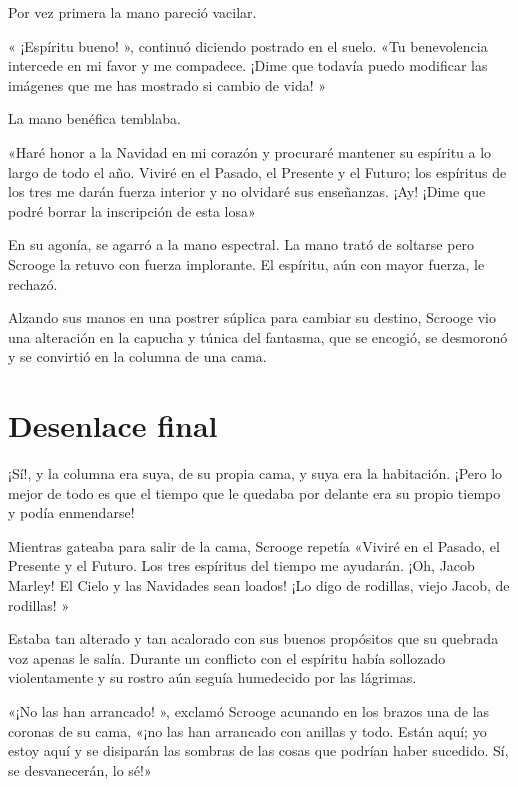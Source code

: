 \documentclass{novela}
\begin{document}
 Por vez primera la mano pareció vacilar.

 « ¡Espíritu bueno! », continuó diciendo postrado en el suelo. «Tu benevolencia intercede en mi favor y me compadece. ¡Dime que todavía puedo modificar las imágenes que me has mostrado si cambio de vida! »

 La mano benéfica temblaba.

 «Haré honor a la Navidad en mi corazón y procuraré mantener su espíritu a lo largo de todo el año. Viviré en el Pasado, el Presente y el Futuro; los espíritus de los tres me darán fuerza interior y no olvidaré sus enseñanzas. ¡Ay! ¡Dime que podré borrar la inscripción de esta losa»

 En su agonía, se agarró a la mano espectral. La mano trató de soltarse pero Scrooge la retuvo con fuerza implorante. El espíritu, aún con mayor fuerza, le rechazó.

 Alzando sus manos en una postrer súplica para cambiar su destino, Scrooge vio una alteración en la capucha y túnica del fantasma, que se encogió, se desmoronó y se convirtió en la columna de una cama.






 \chapter{Desenlace final}



 ¡Sí!, y la columna era suya, de su propia cama, y suya era la habitación. ¡Pero lo mejor de todo es que el tiempo que le quedaba por delante era su propio tiempo y podía enmendarse!

 Mientras gateaba para salir de la cama, Scrooge repetía «Viviré en el Pasado, el Presente y el Futuro. Los tres espíritus del tiempo me ayudarán. ¡Oh, Jacob Marley! El Cielo y las Navidades sean loados! ¡Lo digo de rodillas, viejo Jacob, de rodillas! »

 Estaba tan alterado y tan acalorado con sus buenos propósitos que su quebrada voz apenas le salía. Durante un conflicto con el espíritu había sollozado violentamente y su rostro aún seguía humedecido por las lágrimas.

 «¡No las han arrancado! », exclamó Scrooge acunando en los brazos una de las coronas de su cama, «¡no las han arrancado con anillas y todo. Están aquí; yo estoy aquí y se disiparán las sombras de las cosas que podrían haber sucedido. Sí, se desvanecerán, lo sé!»
\end{document}
